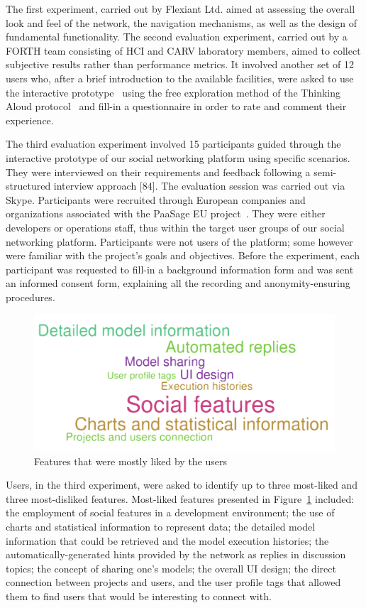 The first experiment, carried out by Flexiant Ltd. aimed at assessing the overall look and feel of the network, the navigation mechanisms, as well as the design of fundamental functionality.
The second evaluation experiment, carried out by a FORTH team consisting of HCI and CARV laboratory members, aimed to collect subjective results rather than performance metrics. It involved another set of 12 users who, after a brief introduction to the available facilities, were asked to use the interactive prototype~\cite{Virzi1996} using the free exploration method of the Thinking Aloud protocol~\cite{jordan1998introduction} and fill-in a questionnaire in order to rate and comment their experience. 

The third evaluation experiment involved 15 participants guided through the interactive prototype of our social networking platform using specific scenarios. They were interviewed on their requirements and feedback following a semi-structured interview approach [84]. The evaluation session was carried out via Skype. Participants were recruited through European companies and organizations associated with the PaaSage EU project~\cite{paasage}. They were either developers or operations staff, thus within the target user groups of our social networking platform. Participants were not users of the  platform; some however were familiar with the project’s goals and objectives. Before the experiment, each participant was requested to fill-in a background information form and was sent an informed consent form, explaining all the recording and anonymity-ensuring procedures. 

\begin{figure}[h]
	\centering
	\includegraphics[width=1\textwidth,natwidth=200,natheight=150]{./fig/most-liked.pdf}
	\caption{Features that were mostly liked by the users}
	\label{fig:most-liked}
\end{figure}

Users, in the third experiment, were asked to identify up to three most-liked and three most-disliked features. Most-liked features presented in Figure~\ref{fig:most-liked} included: the employment of social features in a development environment; the use of charts and statistical information to represent data; the detailed model information that could be retrieved and the model execution histories; the automatically-generated hints provided by the network as replies in discussion topics; the concept of sharing one’s models; the overall UI design; the direct connection between projects and users, and the user profile tags that allowed them to find users that would be interesting to connect with.

